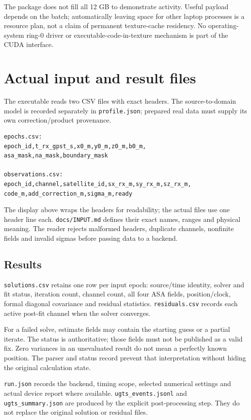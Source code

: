 \documentclass[11pt,a4paper]{article}
\newcommand{\code}[1]{\texttt{#1}}
\begin{document}
The package does not fill all 12 GB to demonstrate activity. Useful payload depends
on the batch; automatically leaving space for other laptop processes is a resource
plan, not a claim of permanent texture-cache residency. No operating-system ring-0
driver or executable-code-in-texture mechanism is part of the CUDA interface.
\clearpage

\section{Actual input and result files}
The executable reads two CSV files with exact headers. The source-to-domain model is
recorded separately in \code{profile.json}; prepared real data must supply its own
correction/product provenance.

\begin{lstlisting}
epochs.csv:
epoch_id,t_rx_gpst_s,x0_m,y0_m,z0_m,b0_m,
asa_mask,na_mask,boundary_mask

observations.csv:
epoch_id,channel,satellite_id,sx_rx_m,sy_rx_m,sz_rx_m,
code_m,add_correction_m,sigma_m,ready
\end{lstlisting}
The display above wraps the headers for readability; the actual files use one header
line each. \code{docs/INPUT.md} defines their exact names, ranges and physical meaning.
The reader rejects malformed headers, duplicate channels, nonfinite fields and invalid
sigmas before passing data to a backend.

\subsection{Results}
\code{solutions.csv} retains one row per input epoch: source/time identity, solver and
fit status, iteration count, channel count, all four ASA fields, position/clock,
formal diagonal covariance and residual statistics. \code{residuals.csv} records each
active post-fit channel when the solver converges.

For a failed solve, estimate fields may contain the starting guess or a partial
iterate. The status is authoritative; those fields must not be published as a valid
fix. Zero variances in an unevaluated result do not mean a perfectly known position.
The parser and status record prevent that interpretation without hiding the original
calculation state.

\code{run.json} records the backend, timing scope, selected numerical settings and
actual device report where available. \code{ugts\_events.jsonl} and
\code{ugts\_summary.json} are produced by the explicit post-processing step. They do
not replace the original solution or residual files.
\end{document}
